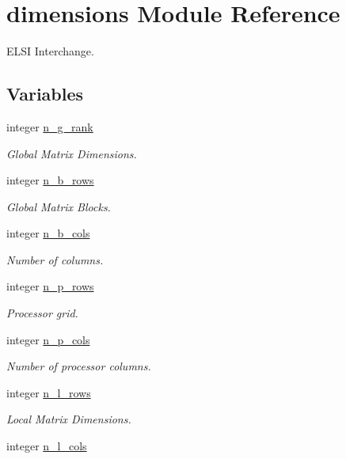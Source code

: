 \hypertarget{namespacedimensions}{}\section{dimensions Module Reference}
\label{namespacedimensions}


E\+L\+S\+I Interchange.  


\subsection*{Variables}
\begin{DoxyCompactItemize}
\item 
integer \hyperlink{namespacedimensions_a9376ca9c441df4fbb42e61ae24871472}{n\+\_\+g\+\_\+rank}
\begin{DoxyCompactList}\small\item\em Global Matrix Dimensions. \end{DoxyCompactList}\item 
integer \hyperlink{namespacedimensions_a70149f9e62c94abbe272f7744460e6a7}{n\+\_\+b\+\_\+rows}
\begin{DoxyCompactList}\small\item\em Global Matrix Blocks. \end{DoxyCompactList}\item 
\hypertarget{namespacedimensions_abc4cd553b2849108ff9f72f9ceb820a9}{}integer \hyperlink{namespacedimensions_abc4cd553b2849108ff9f72f9ceb820a9}{n\+\_\+b\+\_\+cols}\label{namespacedimensions_abc4cd553b2849108ff9f72f9ceb820a9}

\begin{DoxyCompactList}\small\item\em Number of columns. \end{DoxyCompactList}\item 
integer \hyperlink{namespacedimensions_a397d214568d37d3ec2483b2779dcfee0}{n\+\_\+p\+\_\+rows}
\begin{DoxyCompactList}\small\item\em Processor grid. \end{DoxyCompactList}\item 
\hypertarget{namespacedimensions_a9cbe08e2c5bdebf9fa9347b2244b57e2}{}integer \hyperlink{namespacedimensions_a9cbe08e2c5bdebf9fa9347b2244b57e2}{n\+\_\+p\+\_\+cols}\label{namespacedimensions_a9cbe08e2c5bdebf9fa9347b2244b57e2}

\begin{DoxyCompactList}\small\item\em Number of processor columns. \end{DoxyCompactList}\item 
integer \hyperlink{namespacedimensions_a910d07df719e9e944e11513f92f923f5}{n\+\_\+l\+\_\+rows}
\begin{DoxyCompactList}\small\item\em Local Matrix Dimensions. \end{DoxyCompactList}\item 
\hypertarget{namespacedimensions_ae0ae36e5b444036566f3b23d9d8bcc70}{}integer \hyperlink{namespacedimensions_ae0ae36e5b444036566f3b23d9d8bcc70}{n\+\_\+l\+\_\+cols}\label{namespacedimensions_ae0ae36e5b444036566f3b23d9d8bcc70}


\end{DoxyCompactItemize}
